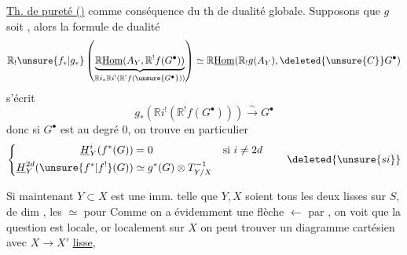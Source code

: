 

\uline{Th. de pureté ()} comme conséquence du
th de dualité globale. Supposons que
$g$ soit 
,
alors la formule de dualité 
\[
\mathbb{R}_!\unsure{f_*|g_*}
\left(\underbrace{\mathbb{R}\underline{\operatorname{Hom}}(A_Y,\mathbb{R}^!f(G^\bullet))}
_{\mathbb{R}i_*\mathbb{R}i^!(\mathbb{R}^!f(\unsure{G^\bullet}))}\right)
\simeq \mathbb{R}\underline{\operatorname{Hom}}(\mathbb{R}_!g(A_Y),\deleted{\unsure{C}}G^\bullet)
\]
s'écrit
\[
g_*(\mathbb{R}i^!(\mathbb{R}^!f(G^\bullet)))\xrightarrow{\sim}G^\bullet
\]
donc si $G^\bullet$ est  au degré $0$, on
trouve en particulier
\[
\left\{
\begin{aligned}
\underline{H}^i_Y(f^*(G))&=0 &&\text{si }i\ne 2d\\
\underline{H}^{2d}_Y(\unsure{f^*|f^!}(G))&\simeq g^*(G)\otimes T_{Y/X}^{-1}
\end{aligned}
\right.
\qquad\deleted{\unsure{si}}
\]

Si maintenant $Y\subset X$ est  une imm.
telle que $Y,X$ soient tous les deux lisses
sur $S$, de dim ,
 
 les $\simeq$  pour  
Comme on a évidemment une flèche 
$\longleftarrow$ par , on voit que la question est
locale, or localement sur $X$ on peut trouver
un diagramme cartésien
avec $X\longrightarrow X'$ \uline{lisse},
